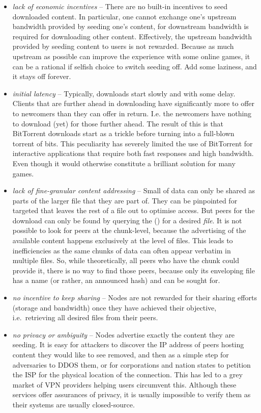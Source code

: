 \begin{itemize}
\item \emph{lack of economic incentives} -- 
There are no built-in incentives to seed downloaded content. In particular, one cannot exchange one's upstream bandwidth provided by seeding one's content, for downstream bandwidth is required for downloading other content. Effectively, the upstream bandwidth provided by seeding content to users is not rewarded. Because as much upstream as possible can improve the experience with some online games, it can be a rational if selfish choice to switch seeding off. Add some laziness, and it stays off forever.

\item \emph{initial latency} -- 
 Typically, downloads start slowly and with some delay. Clients that are further ahead in downloading have significantly more to offer to newcomers than they can offer in return. I.e. the newcomers have nothing to download (yet) for those further ahead. The result of this is that BitTorrent downloads start as a trickle before turning into a full-blown torrent of bits. This peculiarity has severely limited the use of BitTorrent for interactive applications that require both fast responses and high bandwidth. Even though it would otherwise constitute a brilliant solution for many games.
 
\item \emph{lack of fine-granular content addressing} -- Small  of data can only be shared as parts of the larger file that they are part of. They can be pinpointed for targeted that leaves the rest of a file out to optimise access. But peers for the download can only be found by  querying the  () for a desired \emph{file}. It is not possible to look for peers at the chunk-level, because the advertising of the available content happens exclusively at the level of files. This leads to inefficiencies as the same chunks of data can often appear verbatim in multiple files. So, while theoretically, all peers who have the chunk could provide it, there is no way to find those peers, because only its enveloping file has a name (or rather, an announced hash) and can be sought for.

\item \emph{no incentive to keep sharing} --
Nodes are not rewarded for their sharing efforts (storage and bandwidth) once they have achieved their objective, i.e.\ retrieving all desired files from their peers.

\item \emph{no privacy or ambiguity} --
Nodes advertise exactly the content they are seeding. It is easy for attackers to discover the IP address of peers hosting content they would like to see removed, and then as a simple step for adversaries to DDOS them, or for corporations and nation states to petition the ISP for the physical location of the connection. This has led to a grey market of VPN providers helping users circumvent this. Although these services offer assurances of privacy, it is usually impossible to verify them as their systems  are usually closed-source. 
\end{itemize}

